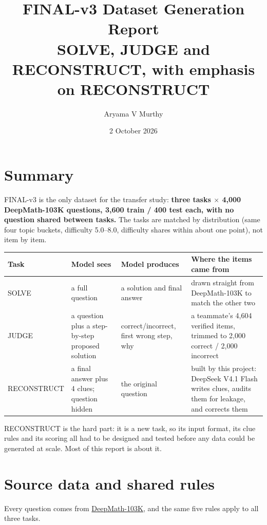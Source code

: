 \documentclass[11pt,a4paper]{article}
\title{FINAL-v3 Dataset Generation Report\\[2pt]\large SOLVE, JUDGE and RECONSTRUCT, with emphasis on RECONSTRUCT}
\author{Aryama V Murthy}
\date{2 October 2026}
\begin{document}
\maketitle

\section{Summary}

FINAL-v3 is the only dataset for the transfer study: \textbf{three tasks $\times$ 4,000 DeepMath-103K questions, 3,600 train / 400 test each, with no question shared between tasks.} The tasks are matched by distribution (same four topic buckets, difficulty 5.0--8.0, difficulty shares within about one point), not item by item.

\begin{table}[H]
\centering\small
\begin{tabularx}{\textwidth}{@{}lLLL@{}}
\toprule
Task & Model sees & Model produces & Where the items came from \\
\midrule
SOLVE & a full question & a solution and final answer & drawn straight from DeepMath-103K to match the other two \\
JUDGE & a question plus a step-by-step proposed solution & correct/incorrect, first wrong step, why & a teammate's 4,604 verified items, trimmed to 2,000 correct / 2,000 incorrect \\
RECONSTRUCT & a final answer plus 4 clues; question hidden & the original question & built by this project: DeepSeek V4.1 Flash writes clues, audits them for leakage, and corrects them \\
\bottomrule
\end{tabularx}
\end{table}

RECONSTRUCT is the hard part: it is a new task, so its input format, its clue rules and its scoring all had to be designed and tested before any data could be generated at scale. Most of this report is about it.

\section{Source data and shared rules}

Every question comes from \href{https://huggingface.co/datasets/zwhe99/DeepMath-103K}{DeepMath-103K}, and the same five rules apply to all three tasks.
\end{document}
